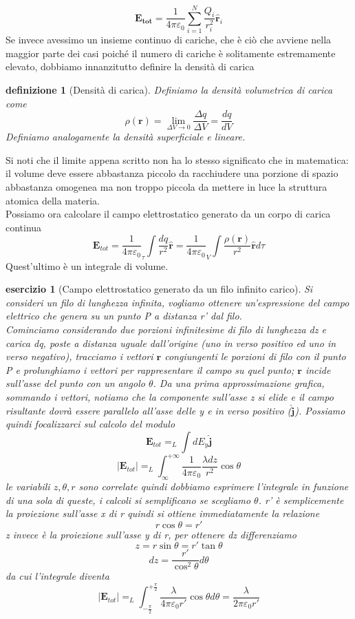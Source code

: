 \documentclass[10pt,a4paper]{article}
\newtheorem{esercizio}{esercizio}
\newtheorem{definizione}{definizione}
\begin{document}
\[\mathbf{E_{tot}} = \frac{1}{4\pi\varepsilon_0}\sum_{i=1}^{N}\frac{Q_i}{ r_i^2} \hat{\mathbf{r}}_i\]
Se invece avessimo un insieme continuo di cariche, che è ciò che avviene nella maggior parte dei casi poiché il numero di cariche è solitamente estremamente elevato, dobbiamo innanzitutto definire la densità di carica
\begin{definizione}[Densità di carica]
Definiamo la densità volumetrica di carica come
\[\rho(\mathbf{r})=\lim_{\Delta V \to 0} \frac{\Delta q}{\Delta V} = \frac{dq}{dV}\]
Definiamo analogamente la densità superficiale e lineare. 
\end{definizione}
Si noti che il limite appena scritto non ha lo stesso significato che in matematica: il volume deve essere abbastanza piccolo da racchiudere una porzione di spazio abbastanza omogenea ma non troppo piccola da mettere in luce la struttura atomica della materia.\\
Possiamo ora calcolare il campo elettrostatico generato da un corpo di carica continua 
\[\mathbf{E}_{tot} = \frac{1}{4\pi\varepsilon_0} _{\tau}\int\frac{dq}{r^2}\hat{\mathbf{r}} = \frac{1}{4\pi\varepsilon_0} _V\int\frac{\rho(\mathbf{r})}{r^2}\hat{\mathbf{r}}d\tau\]
Quest'ultimo è un integrale di volume.
\begin{esercizio}[Campo elettrostatico generato da un filo infinito carico]
Si consideri un filo di lunghezza infinita, vogliamo ottenere un'espressione del campo elettrico che genera su un punto P a distanza r' dal filo. \\
Cominciamo considerando due porzioni infinitesime di filo di lunghezza dz e carica dq, poste a distanza uguale dall'origine (uno in verso positivo ed uno in verso negativo), tracciamo i vettori $\mathbf{r}$ congiungenti le porzioni di filo con il punto P e prolunghiamo i vettori per rappresentare il campo su quel punto; $\mathbf{r}$ incide sull'asse del punto con un angolo $\theta$. Da una prima approssimazione grafica, sommando i vettori, notiamo che la componente sull'asse z si elide e il campo risultante dovrà essere parallelo all'asse delle y e in verso positivo ($\hat{\mathbf{j}}$). Possiamo quindi focalizzarci sul calcolo del modulo
\[\mathbf{E}_{tot} = _L\int dE_y\hat{\mathbf{j}}\]
\[|\mathbf{E}_{tot}| = _L\int^{+\infty}_{\infty} \frac{1}{4\pi\varepsilon_0}\frac{\lambda dz}{r^2}\cos\theta\]
le variabili \(z, \theta, r\) sono correlate quindi dobbiamo esprimere l'integrale in funzione di una sola di queste, i calcoli si semplificano se scegliamo $\theta$. r' è semplicemente la proiezione sull'asse x di r quindi si ottiene immediatamente la relazione
\[r \cos\theta = r'\]
z invece è la proiezione sull'asse y di r, per ottenere dz differenziamo
\[z = r \sin\theta = r' \tan\theta\]
\[dz = \frac{r'}{\cos^2\theta}d\theta\]
da cui l'integrale diventa
\[|\mathbf{E}_{tot}| = _L\int^{+\frac{\pi}{2}}_{-\frac{\pi}{2}} \frac{\lambda}{4\pi\varepsilon_0 r'}\cos\theta d\theta = \frac{\lambda}{2\pi\varepsilon_0 r'}\]
\end{esercizio}
\end{document}
